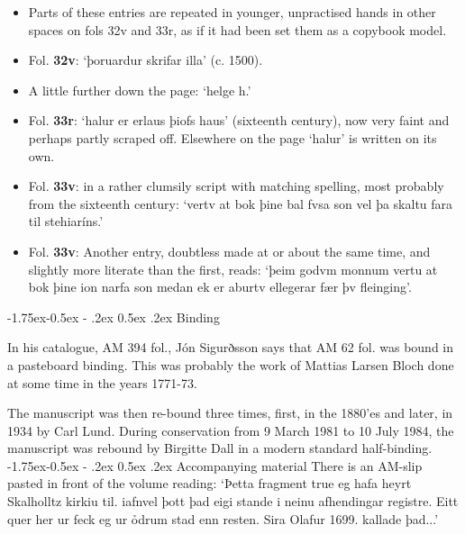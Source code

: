 \documentclass[11pt,twoside]{article}\makeatletter
\makeatletter
\def\ref{}
\renewcommand\subsection{\@startsection{subsection}{2}{\z@}%
     {-1.75ex\@plus -0.5ex \@minus- .2ex}%
     {0.5ex \@plus .2ex}%
     {\reset@font\Large\sffamily}}
\makeatother
\begin{document}
\begin{itemize}
\item Parts of these entries are repeated in younger, unpractised hands in other spaces on fols 32v and 33r, as if it had been set them as a copybook model.
\item Fol. \textbf{32v}:  ‘þoruardur skrifar illa’ (c. 1500).
\item A little further down the page: ‘helge h.’
\item Fol. \textbf{33r}:  ‘halur er erlaus þiofs haus’ (sixteenth century), now very faint and perhaps partly scraped off. Elsewhere on the page ‘halur’ is written on its own.
\item Fol. \textbf{33v}:  in a rather clumsily script with matching spelling, most probably from the sixteenth century: ‘vertv at bok þine {\hskip1pt}\newline  bal fvsa son vel þa skaltu {\hskip1pt}\newline  fara til stehiaríns.’
\item Fol. \textbf{33v}:  Another entry, doubtless made at or about the same time, and slightly more literate than the first, reads: ‘þeim godvm monnum vertu at bok þine ion narfa son medan ek {\hskip1pt}\newline  er aburtv ellegerar fær þv fleinging’.
\end{itemize} 
\subsection{Binding}
\par
In his catalogue,  {\ref AM 394 fol.},  {\name Jón Sigurðsson} says that AM 62 fol. was bound in a pasteboard binding. This was probably the work of  {\name Mattias Larsen Bloch} done at some time in the years 1771-73.\par
The manuscript was then re-bound three times, first, in the 1880'es and later, in 1934 by  {\name Carl Lund}. During conservation from 9 March 1981 to 10 July 1984, the manuscript was rebound by  {\name Birgitte Dall} in a modern standard half-binding.
\subsection{Accompanying material}
There is an AM-slip pasted in front of the volume reading: ‘Þetta fragment true eg hafa {\hskip1pt}\newline  heyrt Skalholltz kirkiu til. {\hskip1pt}\newline  iafnvel þott þad eigi stande {\hskip1pt}\newline  i neinu afhendingar registre. {\hskip1pt}\newline  Eitt quer her ur feck eg ur ỏd{\hskip1pt}\newline rum stad enn resten. {\hskip1pt}\newline  Sira Olafur 1699. kallade þad...’
\end{document}
